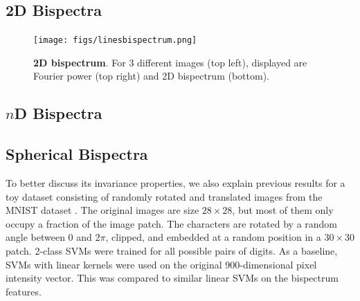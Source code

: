 \documentclass[letterpaper, 10pt]{article}
\theoremstyle{definition}
\begin{document}
\subsection{2D Bispectra}

\begin{figure}
 \begin{center}
   \texttt{[image: figs/linesbispectrum.png]} 
\caption{\textbf{2D bispectrum}. For 3 different images (top left), displayed are Fourier power (top right) and 2D bispectrum (bottom).}
\label{bispetrum_2dex}
\end{center}
\end{figure}

\subsection{$n$D Bispectra}

\subsection{Spherical Bispectra}

To better discuss its invariance properties, we also explain previous results \cite{kondor2007complete} for a toy dataset consisting of randomly rotated and translated images from the MNIST dataset \cite{lecun1998mnist}.  The original images are size $28\times 28$, but most of them only occupy a fraction of the image patch. The characters are rotated by a random angle between 0 and $2\pi$, clipped, and embedded at a random position in a $30\times 30$ patch.  2-class SVMs were trained for all possible pairs of digits. As a baseline, SVMs with linear kernels were used on the original 900-dimensional pixel intensity vector.  This was compared to similar linear SVMs on the bispectrum features. 
\end{document}
